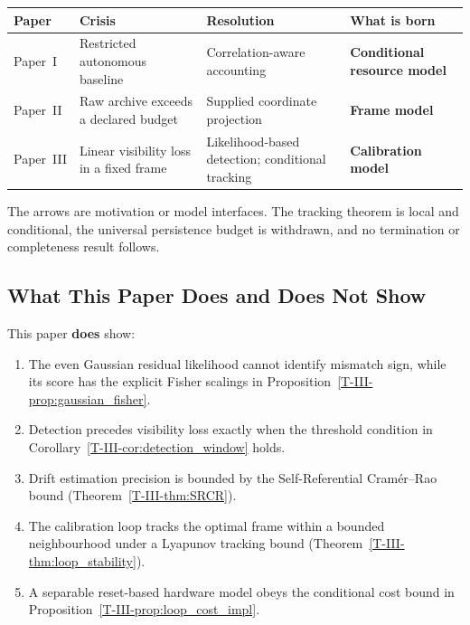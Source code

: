 \documentclass[12pt,a4paper,openany]{book}
\begin{document}
\begin{center}
\small
\setlength{\tabcolsep}{3pt}%
\begin{tabular}{@{}lP{3.2cm}P{3.8cm}l@{}}
\toprule
\textbf{Paper} & \textbf{Crisis} & \textbf{Resolution}
  & \textbf{What is born} \\
\midrule
Paper~I
  & Restricted autonomous baseline
  & Correlation-aware accounting
  & \textbf{Conditional resource model} \\[3pt]
Paper~II
  & Raw archive exceeds a declared budget
  & Supplied coordinate projection
  & \textbf{Frame model} \\[3pt]
Paper~III
  & Linear visibility loss in a fixed frame
  & Likelihood-based detection; conditional tracking
  & \textbf{Calibration model} \\
\bottomrule
\end{tabular}
\end{center}

The arrows are motivation or model interfaces.  The tracking theorem is
local and conditional, the universal persistence budget is withdrawn,
and no termination or completeness result follows.

\subsection{What This Paper Does and Does Not Show}
\label{T-III-subsec:claims}

This paper \textbf{does} show:
\begin{enumerate}
\item The even Gaussian residual likelihood cannot identify mismatch
  sign, while its score has the explicit Fisher scalings in
  Proposition~\ref{T-III-prop:gaussian_fisher}.
\item Detection precedes visibility loss exactly when the threshold
  condition in Corollary~\ref{T-III-cor:detection_window} holds.
\item Drift estimation precision is bounded by the
  Self-Referential Cram\'{e}r--Rao bound
  (Theorem~\ref{T-III-thm:SRCR}).
\item The calibration loop tracks the optimal frame
  within a bounded neighbourhood under a Lyapunov
  tracking bound
  (Theorem~\ref{T-III-thm:loop_stability}).
\item A separable reset-based hardware model obeys the conditional cost
  bound in Proposition~\ref{T-III-prop:loop_cost_impl}.
\end{enumerate}
\end{document}
